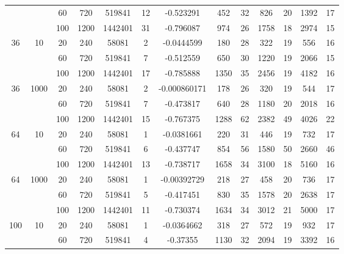 \documentclass[numbers,webpdf,imaiai]{ima-authoring-template}%
\theoremstyle{thmstyletwo}%
\numberwithin{equation}{section}
\numberwithin{equation}{section}
\begin{document}
{\begin{table}[h]
\begin{tabular}{ccccc|cc|cc|cc|cc}
 &  & 60 & 720 & 519841
& 12 & -0.523291
& 452 & 32
& 826 & 20
& 1392 & 17 \\

 &  & 100 & 1200 & 1442401
& 31 & -0.796087
& 974 & 26
& 1758 & 18
& 2974 & 15 \\
\hline

36 & 10 & 20 & 240 & 58081
& 2 & -0.0444599
& 180 & 28
& 322 & 19
& 556 & 16 \\

 &  & 60 & 720 & 519841
& 7 & -0.512559
& 650 & 30
& 1220 & 19
& 2066 & 15 \\

 &  & 100 & 1200 & 1442401
& 17 & -0.785888
& 1350 & 35
& 2456 & 19
& 4182 & 16 \\
\hline

36 & 1000 & 20 & 240 & 58081
& 2 & -0.000860171
& 178 & 26
& 320 & 19
& 544 & 17 \\

 &  & 60 & 720 & 519841
& 7 & -0.473817
& 640 & 28
& 1180 & 20
& 2018 & 16 \\

 &  & 100 & 1200 & 1442401
& 15 & -0.767375
& 1288 & 62
& 2382 & 49
& 4026 & 22 \\
\hline

64 & 10 & 20 & 240 & 58081
& 1 & -0.0381661
& 220 & 31
& 446 & 19
& 732 & 17 \\

 &  & 60 & 720 & 519841
& 6 & -0.437747
& 854 & 56
& 1580 & 50
& 2660 & 46 \\

 &  & 100 & 1200 & 1442401
& 13 & -0.738717
& 1658 & 34
& 3100 & 18
& 5160 & 16 \\
\hline

64 & 1000 & 20 & 240 & 58081
& 1 & -0.00392729
& 218 & 27
& 458 & 20
& 736 & 17 \\

 &  & 60 & 720 & 519841
& 5 & -0.417451
& 830 & 35
& 1578 & 20
& 2638 & 17 \\

 &  & 100 & 1200 & 1442401
& 11 & -0.730374
& 1634 & 34
& 3012 & 21
& 5000 & 17 \\
\hline

100 & 10 & 20 & 240 & 58081
& 1 & -0.0364662
& 318 & 27
& 572 & 19
& 932 & 17 \\

 &  & 60 & 720 & 519841
& 4 & -0.37355
& 1130 & 32
& 2094 & 19
& 3392 & 16 \\


\end{tabular}
\end{table}}
\end{document}
